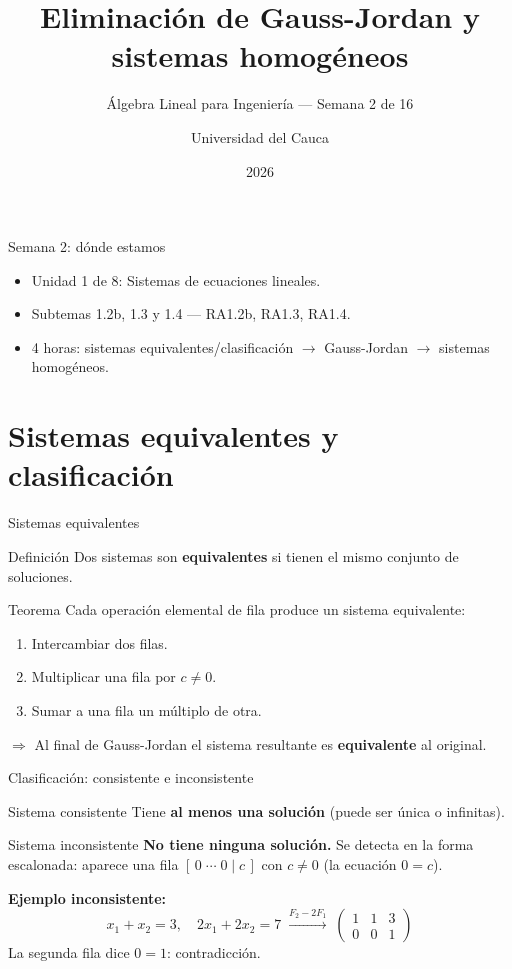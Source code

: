 \documentclass[11pt]{beamer}
\title[Semana 2: Gauss-Jordan]{Eliminación de Gauss-Jordan y sistemas homogéneos}
\subtitle{Álgebra Lineal para Ingeniería --- Semana 2 de 16}
\author{Universidad del Cauca}
\date{2026}
\begin{document}
\begin{frame}
  \titlepage
\end{frame}

\begin{frame}{Semana 2: dónde estamos}
  \begin{itemize}
    \item Unidad 1 de 8: Sistemas de ecuaciones lineales.
    \item Subtemas 1.2b, 1.3 y 1.4 --- RA1.2b, RA1.3, RA1.4.
    \item 4 horas: sistemas equivalentes/clasificación $\to$ Gauss-Jordan $\to$ sistemas homogéneos.
  \end{itemize}
  \tableofcontents
\end{frame}

\section{Sistemas equivalentes y clasificación}

\begin{frame}{Sistemas equivalentes}
  \begin{block}{Definición}
    Dos sistemas son \textbf{equivalentes} si tienen el mismo conjunto de soluciones.
  \end{block}
  \vfill
  \begin{alertblock}{Teorema}
    Cada operación elemental de fila produce un sistema equivalente:
    \begin{enumerate}
      \item Intercambiar dos filas.
      \item Multiplicar una fila por $c\neq 0$.
      \item Sumar a una fila un múltiplo de otra.
    \end{enumerate}
  \end{alertblock}
  \vfill
  $\Rightarrow$ Al final de Gauss-Jordan el sistema resultante es \textbf{equivalente} al original.
\end{frame}

\begin{frame}{Clasificación: consistente e inconsistente}
  \begin{block}{Sistema consistente}
    Tiene \textbf{al menos una solución} (puede ser única o infinitas).
  \end{block}
  \begin{alertblock}{Sistema inconsistente}
    \textbf{No tiene ninguna solución.} Se detecta en la forma escalonada:
    aparece una fila $[\,0\;\cdots\;0\mid c\,]$ con $c\neq 0$ (la ecuación $0=c$).
  \end{alertblock}
  \vfill
  \textbf{Ejemplo inconsistente:}
  \[
    x_1+x_2=3,\quad 2x_1+2x_2=7
    \;\xrightarrow{F_2-2F_1}\;
    \left(\begin{array}{cc|c}1&1&3\\0&0&1\end{array}\right)
  \]
  La segunda fila dice $0=1$: contradicción.
\end{frame}
\end{document}
